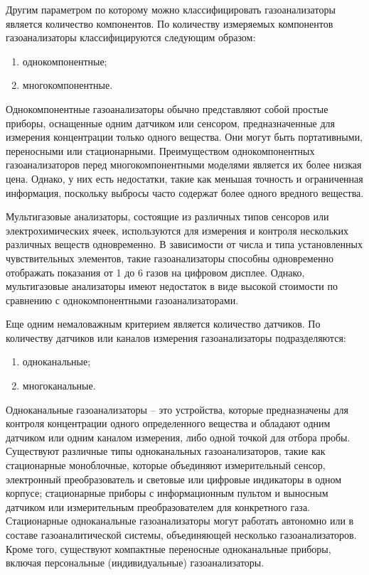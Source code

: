\documentclass[14pt, a4paper]{extreport}
\begin{document}
	Другим параметром по которому можно классифицировать газоанализаторы является количество компонентов. По количеству измеряемых компонентов газоанализаторы классифицируются следующим образом:
	\begin{enumerate}[label={\arabic*)}]
		\item однокомпонентные;
		\item многокомпонентные.
	\end{enumerate}
	
	Однокомпонентные газоанализаторы обычно представляют собой простые приборы, оснащенные одним датчиком или сенсором, предназначенные для измерения концентрации только одного вещества. Они могут быть портативными, переносными или стационарными. Преимуществом однокомпонентных газоанализаторов перед многокомпонентными моделями является их более низкая цена. Однако, у них есть недостатки, такие как меньшая точность и ограниченная информация, поскольку выбросы часто содержат более одного вредного вещества.
	
	Мультигазовые анализаторы, состоящие из различных типов сенсоров или электрохимических ячеек, используются для измерения и контроля нескольких различных веществ одновременно. В зависимости от числа и типа установленных чувствительных элементов, такие газоанализаторы способны одновременно отображать показания от 1 до 6 газов на цифровом дисплее. Однако, мультигазовые анализаторы имеют недостаток в виде высокой стоимости по сравнению с однокомпонентными газоанализаторами.
	
	Еще одним немаловажным критерием является количество датчиков. По количеству датчиков или каналов измерения газоанализаторы подразделяются:
	\begin{enumerate}[label={\arabic*)}]
		\item одноканальные;
		\item многоканальные.
	\end{enumerate}
	
	Одноканальные газоанализаторы -- это устройства, которые предназначены для контроля концентрации одного определенного вещества и обладают одним датчиком или одним каналом измерения, либо одной точкой для отбора пробы. Существуют различные типы одноканальных газоанализаторов, такие как стационарные моноблочные, которые объединяют измерительный сенсор, электронный преобразователь и световые или цифровые индикаторы в одном корпусе; стационарные приборы с информационным пультом и выносным датчиком или измерительным преобразователем для конкретного газа. Стационарные одноканальные газоанализаторы могут работать автономно или в составе газоаналитической системы, объединяющей несколько газоанализаторов. Кроме того, существуют компактные переносные одноканальные приборы, включая персональные (индивидуальные) газоанализаторы.
	
\end{document}

